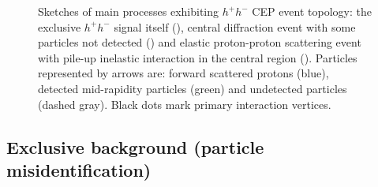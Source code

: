 \begin{figure}[h]
{}%
\quad%
\parbox{0.315\textwidth}{%
  \centering%
  \begin{subfigure}[b]{0.9\linewidth}{
                }
  \end{subfigure} 
}%
\caption[Sketches of main processes with CEP event topology.]{Sketches of main processes exhibiting $h^{+}h^{-}$ CEP event topology: the exclusive $h^{+}h^{-}$ signal itself (), central diffraction event with some particles not detected () and elastic proton-proton scattering event with pile-up inelastic interaction in the central region (). Particles represented by arrows are: forward scattered protons (blue), detected mid-rapidity particles (green) and undetected particles (dashed gray). Black dots mark primary interaction vertices.}\label{fig:bkgdSources}
\end{figure}
 
 

\newpage
\subsection{Exclusive background (particle misidentification)}\label{sec:exclBkgd}

